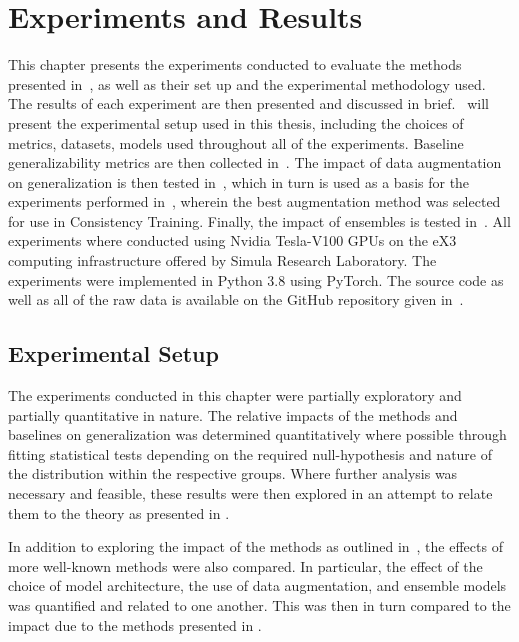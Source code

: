 \chapter{Experiments and Results}\label{experiments}
This chapter presents the experiments conducted to evaluate the methods presented in~, as well as their set up and the experimental methodology used. The results of each experiment are then presented and discussed in brief.~ will present the experimental setup used in this thesis, including the choices of metrics, datasets, models used throughout all of the experiments. Baseline generalizability metrics are then collected in~. The impact of data augmentation on generalization is then tested in~, which in turn is used as a basis for the experiments performed in~, wherein the best augmentation method was selected for use in Consistency Training. Finally, the impact of ensembles is tested in~. All experiments where conducted using Nvidia Tesla-V100 GPUs on the eX3 computing infrastructure offered by Simula Research Laboratory. The experiments were implemented in Python 3.8 using PyTorch. The source code as well as all of the raw data is available on the GitHub repository given in~.

\section{Experimental Setup}\label{exp_meth}
The experiments conducted in this chapter were partially exploratory and partially quantitative in nature. The relative impacts of the methods and baselines on generalization was determined quantitatively where possible through fitting statistical tests depending on the required null-hypothesis and nature of the distribution within the respective groups. Where further analysis was necessary and feasible, these results were then explored in an attempt to relate them to the theory as presented in . 

In addition to exploring the impact of the methods as outlined in~, the effects of more well-known methods were also compared. In particular, the effect of the choice of model architecture, the use of data augmentation, and ensemble models was quantified and related to one another. This was then in turn compared to the impact due to the methods presented in . 

